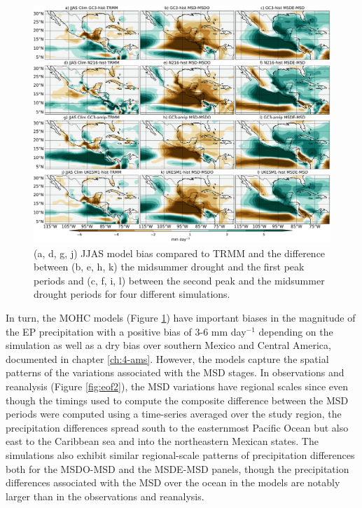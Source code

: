 \begin{figure}[t!]
\includegraphics[width=\linewidth]{figures/fig2obs_prmodels3}
\caption{ (a, d, g, j) JJAS model bias compared to TRMM and the difference between  (b, e, h, k)  the midsummer drought and the first peak periods and (c, f, i, l)  between the second peak and the midsummer drought periods for four different simulations.}
\label{fig:model_pr}
\end{figure} 
 
  In turn, the MOHC models (Figure \ref{fig:model_pr}) have important biases in the magnitude of the EP precipitation with a positive bias of 3-6 mm day$^{-1}$ depending on the simulation as well as a dry bias over southern Mexico and Central America, documented in chapter \ref{ch:4-ams}. However, the models capture the spatial patterns of the variations associated with the MSD stages.
  In observations and reanalysis (Figure \ref{fig:eof2}), the MSD variations have regional scales since even though the timings used to compute the composite difference between the MSD periods were computed using a time-series averaged over the study region, the precipitation differences spread south to the easternmost Pacific Ocean but also east to the Caribbean sea and into the northeastern Mexican states. The simulations also exhibit similar regional-scale patterns of precipitation differences both for the MSDO-MSD and the MSDE-MSD panels, though the precipitation differences associated with the MSD over the ocean in the models are notably larger than in the observations and reanalysis.  
 

